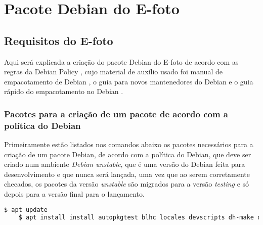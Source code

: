 \chapter{Pacote Debian do E-foto}
\section{Requisitos do E-foto}

Aqui será explicada a criação do pacote Debian do E-foto de acordo com as regras da Debian Policy \cite{bib:Ian}, cujo material de auxílio usado foi manual de empacotamento de Debian \cite{bib:Lucas}, o guia para novos mantenedores do Debian \cite{bib:Josip} e o guia rápido do empacotamento no Debian \cite{bib:Filho2020}.  

\subsection{Pacotes para a criação de um pacote de acordo com a política do Debian}

Primeiramente estão listados nos comandos abaixo os pacotes necessários para a criação de um pacote Debian, de acordo com a política do Debian, que deve ser criado num ambiente \textit{Debian unstable}, que é uma versão do Debian feita para desenvolvimento e que nunca será lançada, uma vez que ao serem corretamente checados, os pacotes da versão \textit{unstable} são migrados para a versão \textit{testing} e só depois para a versão final para o lançamento.

\begin{lstlisting}[language=bash]
	$ apt update
	$ apt install install autopkgtest blhc locales devscripts dh-make dput-ng mc quilt spell tardiff tree
\end{lstlisting}

